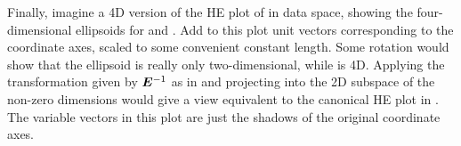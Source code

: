 Finally, imagine a 4D version of the HE plot of  in data space,
showing the four-dimensional ellipsoids for  and .  Add to this plot
unit vectors corresponding to the coordinate axes, scaled to some convenient constant length.
Some rotation would
show that the 
ellipsoid is really only two-dimensional, while  is 4D.
Applying the transformation given by $\bm{\bm{E}}^{-1}$ as in 
and projecting into the 2D subspace of the non-zero dimensions would give a view equivalent to the
canonical HE plot in .
The variable vectors in this plot are just the shadows of the original coordinate axes.


